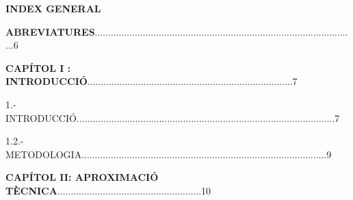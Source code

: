 \documentclass[12pt]{article}
\begin{document}
\vspace{\baselineskip}

\vspace{\baselineskip}

\vspace{\baselineskip}
\begin{Center}
{\fontsize{16pt}{19.2pt}\selectfont \textbf{INDEX GENERAL}\par}
\end{Center}\par


\vspace{\baselineskip}

\vspace{\baselineskip}
\begin{justify}
\textbf{ABREVIATURES}..................................................................................................6
\end{justify}\par


\vspace{\baselineskip}

\vspace{\baselineskip}
\begin{justify}
\textbf{CAPÍTOL I : INTRODUCCIÓ}.............................................................................7
\end{justify}\par


\vspace{\baselineskip}

\vspace{\baselineskip}
\begin{justify}
1.- INTRODUCCIÓ.................................................................................................7
\end{justify}\par


\vspace{\baselineskip}
\begin{justify}
1.2.- METODOLOGIA............................................................................................9
\end{justify}\par


\vspace{\baselineskip}

\vspace{\baselineskip}
\begin{justify}
\textbf{CAPÍTOL II: APROXIMACIÓ TÈCNICA}......................................................10
\end{justify}\par
\end{document}
